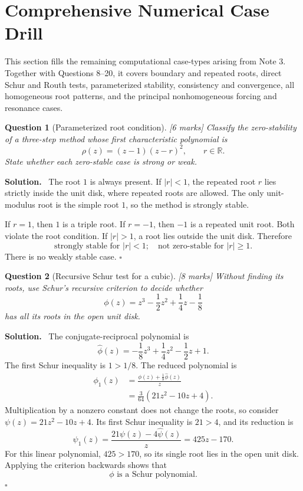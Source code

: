 \documentclass[11pt,a4paper]{article}
\theoremstyle{questionstyle}
\newtheorem{question}{Question}
\newenvironment{solution}
  {\par\noindent\textbf{\color{solutiongreen}Solution.}\ }
  {\hfill$\square$\par}
\newcommand{\pointmark}[1]{\hfill\textnormal{\textit{[#1 marks]}}}
\newcommand{\R}{\mathbb{R}}
\newcommand{\abs}[1]{\left|#1\right|}
\begin{document}
\section{Comprehensive Numerical Case Drill}

This section fills the remaining computational case-types arising from
Note 3.  Together with Questions 8--20, it covers boundary and repeated
roots, direct Schur and Routh tests, parameterized stability,
consistency and convergence, all homogeneous root patterns, and the
principal nonhomogeneous forcing and resonance cases.

\begin{question}[Parameterized root condition]\pointmark{6}
Classify the zero-stability of a three-step method whose first
characteristic polynomial is
\[
  \rho(z)=(z-1)(z-r)^2,\qquad r\in\R.
\]
State whether each zero-stable case is strong or weak.
\end{question}

\begin{solution}
The root \(1\) is always present.  If \(\abs r<1\), the repeated root
\(r\) lies strictly inside the unit disk, where repeated roots are
allowed.  The only unit-modulus root is the simple root \(1\), so the
method is strongly stable.

If \(r=1\), then \(1\) is a triple root.  If \(r=-1\), then \(-1\) is
a repeated unit root.  Both violate the root condition.  If
\(\abs r>1\), a root lies outside the unit disk.  Therefore
\[
  \boxed{\text{strongly stable for }\abs r<1;
  \quad\text{not zero-stable for }\abs r\geq1.}
\]
There is no weakly stable case.
\end{solution}

\begin{question}[Recursive Schur test for a cubic]\pointmark{8}
Without finding its roots, use Schur's recursive criterion to decide
whether
\[
  \phi(z)=z^3-\frac12z^2+\frac14z-\frac18
\]
has all its roots in the open unit disk.
\end{question}

\begin{solution}
The conjugate-reciprocal polynomial is
\[
  \widehat\phi(z)
  =-\frac18z^3+\frac14z^2-\frac12z+1.
\]
The first Schur inequality is \(1>1/8\).  The reduced polynomial is
\[
\begin{split}
  \phi_1(z)
  &=\frac{\phi(z)+\frac18\widehat\phi(z)}{z}\\
  &=\frac3{64}(21z^2-10z+4).
\end{split}
\]
Multiplication by a nonzero constant does not change the roots, so
consider \(\psi(z)=21z^2-10z+4\).  Its first Schur inequality is
\(21>4\), and its reduction is
\[
  \psi_1(z)
  =\frac{21\psi(z)-4\widehat\psi(z)}{z}
  =425z-170.
\]
For this linear polynomial, \(425>170\), so its single root lies in
the open unit disk.  Applying the criterion backwards shows that
\[
  \boxed{\phi\text{ is a Schur polynomial}.}
\]
\end{solution}
\end{document}
